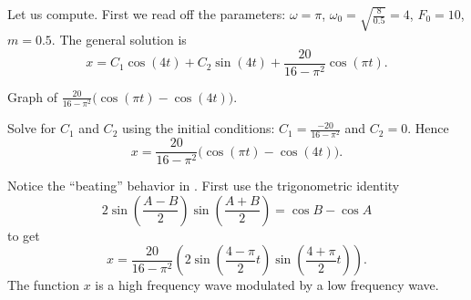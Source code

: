 \documentclass{ximera}
\begin{document}
\begin{exampleSol}
    Let us compute.  First we read off the parameters: $\omega = \pi$, $\omega_0 = \sqrt{\frac{8}{0.5}} = 4$, $F_0 = 10$, $m=0.5$.  The general solution is 
    \begin{equation*}
        x = C_1 \cos (4 t) + C_2 \sin (4 t) + \frac{20}{16 - \pi^2} \cos (\pi t) .
    \end{equation*}
    
    \begin{mywrapfig}[15]{3.25in}
        \capstart
        \caption{Graph of $\frac{20}{16 - \pi^2} \bigl( \cos (\pi t)- \cos (4 t) \bigr)$.\label{3.6:beatingfig}}
    \end{mywrapfig}
    
    
    Solve for $C_1$ and $C_2$ using the initial conditions: $C_1 = \frac{-20}{16 - \pi^2}$ and $C_2 = 0$.  Hence
    \begin{equation*}
        x = \frac{20}{16 - \pi^2} \bigl( \cos (\pi t)- \cos (4 t) \bigr) .
    \end{equation*}
    
    
    Notice the ``beating'' behavior in .  First use the trigonometric identity
    \begin{equation*}
        2\sin \left( \frac{A-B}{2} \right) \sin \left( \frac{A+B}{2} \right) = \cos B -\cos A 
    \end{equation*}
    to get 
    \begin{equation*}
        x = \frac{20}{16 - \pi^2} \left( 2 \sin \left(\frac{4-\pi}{2} t \right) \sin \left( \frac{4+\pi}{2} t \right) \right) .
    \end{equation*}
    The function $x$ is a high frequency wave modulated by a low frequency wave.
\end{exampleSol}
\end{document}
